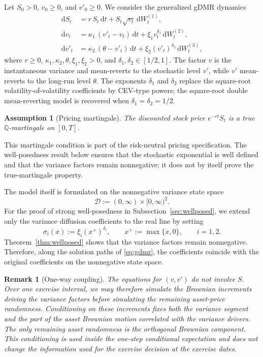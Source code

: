 \documentclass[pdflatex,sn-mathphys-num]{sn-jnl}
\theoremstyle{thmstyleone}%
\theoremstyle{thmstylethree}%
\newtheorem{assumption}[theorem]{Assumption}
\theoremstyle{thmstyletwo}%
\newtheorem{remark}[theorem]{Remark}
\newcommand{\dd}{\mathrm d}
\newcommand{\Q}{\mathbb Q}
\begin{document}
Let $S_0>0$, $v_0\ge0$, and $v'_0\ge0$. We consider the generalized gDMR dynamics
\begin{equation}\label{eq:gdmr}
\begin{aligned}
\dd S_t &= r\,S_t\,\dd t + S_t\sqrt{v_t}\,\dd W^{(1)}_t,\\
\dd v_t &= \kappa_1\,(v'_t - v_t)\,\dd t + \xi_1 v_t^{\delta_1}\,\dd W^{(2)}_t,\\
\dd v'_t &= \kappa_2\,(\theta - v'_t)\,\dd t + \xi_2 (v'_t)^{\delta_2}\,\dd W^{(3)}_t,
\end{aligned}
\end{equation}
where $r\ge0$, $\kappa_1,\kappa_2,\theta,\xi_1,\xi_2>0$, and
$\delta_1,\delta_2\in[1/2,1]$. The factor $v$ is the instantaneous variance and
mean-reverts to the stochastic level $v'$, while $v'$ mean-reverts to the
long-run level $\theta$. The exponents $\delta_1$ and $\delta_2$ replace the
square-root volatility-of-volatility coefficients by CEV-type powers; the
square-root double mean-reverting model is recovered when
$\delta_1=\delta_2=1/2$.

\begin{assumption}[Pricing martingale]\label{ass:pricing-martingale}
The discounted stock price $e^{-rt}S_t$ is a true $\Q$-martingale on $[0,T]$.
\end{assumption}

This martingale condition is part of the risk-neutral pricing specification.
The well-posedness result below ensures that the stochastic exponential is well
defined and that the variance factors remain nonnegative; it does not by itself
prove the true-martingale property.

The model itself is formulated on the nonnegative variance state space
$$
\mathcal D:=(0,\infty)\times[0,\infty)^2.
$$
For the proof of strong well-posedness in Subsection~\ref{sec:wellposed}, we
extend only the variance diffusion coefficients to the real line by setting
$$
\sigma_i(x):=\xi_i(x^+)^{\delta_i},\qquad
x^+:=\max\{x,0\},\qquad i=1,2.
$$
Theorem~\ref{thm:wellposed} shows that the variance factors remain
nonnegative. Therefore, along the solution paths of \eqref{eq:gdmr}, the
coefficients coincide with the original coefficients on the nonnegative state
space.

\begin{remark}[One-way coupling]\label{rem:one-way}
The equations for $(v,v')$ do not involve $S$. Over one exercise interval, we
may therefore simulate the Brownian increments driving the variance factors
before simulating the remaining asset-price randomness. Conditioning on these increments
fixes both the variance segment and the part of the asset Brownian motion
correlated with the variance drivers. The only remaining asset randomness is
the orthogonal Brownian component. This conditioning is used inside the
one-step conditional expectation and does not change the information used for
the exercise decision at the exercise dates.
\end{remark}
\end{document}
